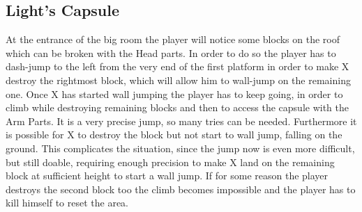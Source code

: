 \subsection{Light's Capsule}
At the entrance of the big room the player will notice some blocks on the roof which can be broken with the Head parts. In order to do so the player has to dash-jump to the left from the very end of the first platform in order to make X destroy the rightmost block, which will allow him to wall-jump on the remaining one. Once X has started wall jumping the player has to keep going, in order to climb while destroying remaining blocks and then to access the capsule with the Arm Parts. It is a very precise jump, so many tries can be needed. Furthermore it is possible for X to destroy the block but not start to wall jump, falling on the ground. This complicates the situation, since the jump now is even more difficult, but still doable, requiring enough precision to make X land on the remaining block at sufficient height to start a wall jump. If for some reason the player destroys the second block too the climb becomes impossible and the player has to kill himself to reset the area.
